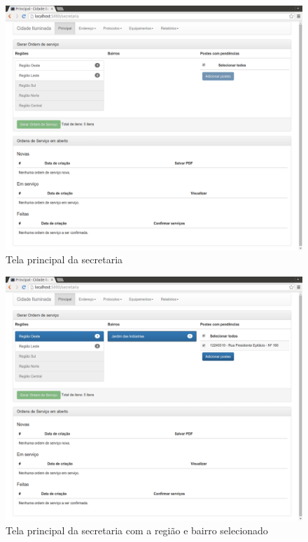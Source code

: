 \documentclass[
	article,			%
	11pt,				%
	oneside,			%
	a4paper,			%
	english,			%
	brazil,				%
	sumario=tradicional
	]{abntex2}
\begin{document}
\begin{figure}[!htbp]
 \centering
 \caption{\label{site-tela-secretaria}Tela principal da secretaria}
 \includegraphics[scale=0.25]{site/7-tela_secretaria.png}
\end{figure}

\begin{figure}[!htbp]
 \centering
 \caption{\label{site-seleciona-bairro}Tela principal da secretaria com a região e bairro selecionado}
 \includegraphics[scale=0.25]{site/8-bairro.png}
\end{figure}
\end{document}
